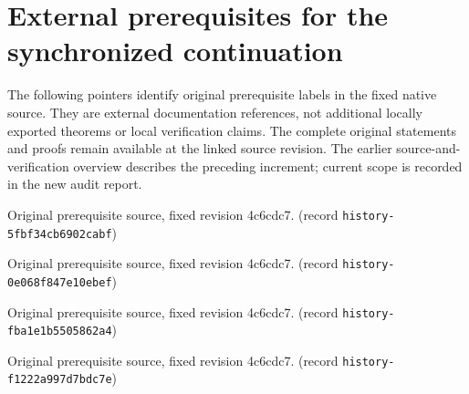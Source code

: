 \section{External prerequisites for the synchronized continuation}
\label{sec:external-prerequisites-20261021}
The following pointers identify original prerequisite labels in the fixed native source.
They are external documentation references, not additional locally exported theorems or local verification claims.
The complete original statements and proofs remain available at the linked source revision.
The earlier source-and-verification overview describes the preceding increment; current scope is recorded in the new audit report.
\par\medskip\noindent\texttt{}\par
\label{ana:analytic-noether}
\label{ana:analytic-preimage}
\label{ana:blowup-existence}
\label{ana:blowups}
\label{ana:cartan-coherence}
\label{ana:geometric-setting}
\label{ana:local-holomorphic-inverse}
\label{ana:nonkahler-locus}
\label{ana:regular-component}
\label{ana:regular-transport}
\label{ana:restricted-calculus}
\label{ana:restricted-colon}
\label{ana:strict-transform-blowup}
\label{ana:strict-transform-composition}
\label{ana:strict-transform-sequence}
Original prerequisite source, fixed revision 4c6cdc7. (record \texttt{history-5fbf34cb6902cabf})\par
\par\medskip\noindent\texttt{}\par
\label{bex:hadamard}
Original prerequisite source, fixed revision 4c6cdc7. (record \texttt{history-0e068f847e10ebef})\par
\par\medskip\noindent\texttt{}\par
\label{fpgeom:complex-analytic-subvariety}
Original prerequisite source, fixed revision 4c6cdc7. (record \texttt{history-fba1e1b5505862a4})\par
\par\medskip\noindent\texttt{}\par
\label{hir:real-domain-actual-ideal-module-presheaf-stalk-action}
Original prerequisite source, fixed revision 4c6cdc7. (record \texttt{history-f1222a997d7bdc7e})\par
\par\medskip\noindent\texttt{}\par
